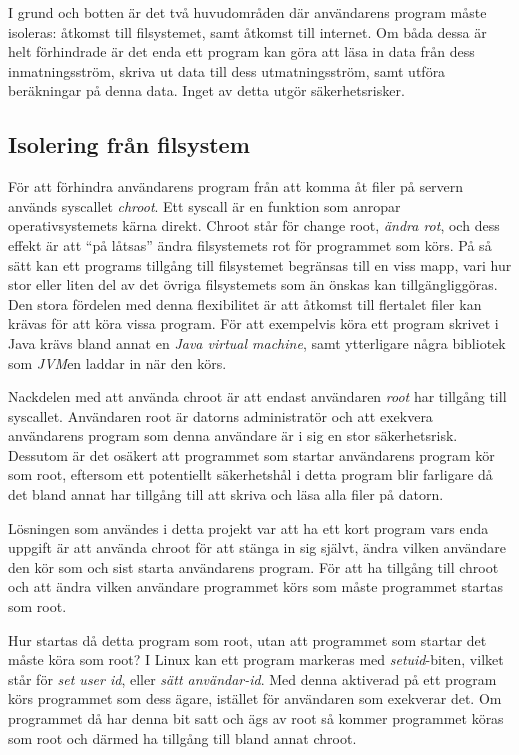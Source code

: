 \documentclass{article}
\begin{document}
I grund och botten är det två huvudområden där användarens program måste
isoleras: åtkomst till filsystemet, samt åtkomst till internet. Om båda dessa är
helt förhindrade är det enda ett program kan göra att läsa in data från dess
inmatningsström, skriva ut data till dess utmatningsström, samt utföra
beräkningar på denna data. Inget av detta utgör säkerhetsrisker.

\subsection{Isolering från filsystem}

För att förhindra användarens program från att komma åt filer på servern används
syscallet \textit{chroot}. Ett syscall är en funktion som anropar
operativsystemets kärna direkt. Chroot står för change root,
\textit{ändra rot}, och dess effekt är att ``på låtsas'' ändra filsystemets rot
för programmet som körs. På så sätt kan ett programs tillgång till filsystemet
begränsas till en viss mapp, vari hur stor eller liten del av det övriga
filsystemets som än önskas kan tillgängliggöras. Den stora fördelen med denna
flexibilitet är att åtkomst till flertalet filer kan krävas för att köra vissa
program. För att exempelvis köra ett program skrivet i Java krävs bland annat en
\textit{Java virtual machine}, samt ytterligare några bibliotek som
\textit{JVM}en laddar in när den körs.

Nackdelen med att använda chroot är att endast användaren \textit{root} har
tillgång till syscallet. Användaren root är datorns administratör och att
exekvera an\-vändarens program som denna användare är i sig en stor
säkerhetsrisk.  Dessutom är det osäkert att programmet som startar användarens
program kör som root, eftersom ett potentiellt säkerhetshål i detta program blir
farligare då det bland annat har tillgång till att skriva och läsa alla filer på
datorn.

Lösningen som användes i detta projekt var att ha ett kort program vars enda
uppgift är att använda chroot för att stänga in sig självt, ändra vilken
användare den kör som och sist starta användarens program. För att ha tillgång
till chroot och att ändra vilken användare programmet körs som måste programmet
startas som root.

Hur startas då detta program som root, utan att programmet som startar det måste
köra som root? I Linux kan ett program markeras med \textit{setuid}-biten,
vilket står för \textit{set user id}, eller \textit{sätt användar-id}. Med
denna aktiverad på ett program körs programmet som dess ägare, istället för
användaren som exekverar det. Om programmet då har denna bit satt och ägs av
root så kommer programmet köras som root och därmed ha tillgång till bland annat
chroot.
\end{document}
